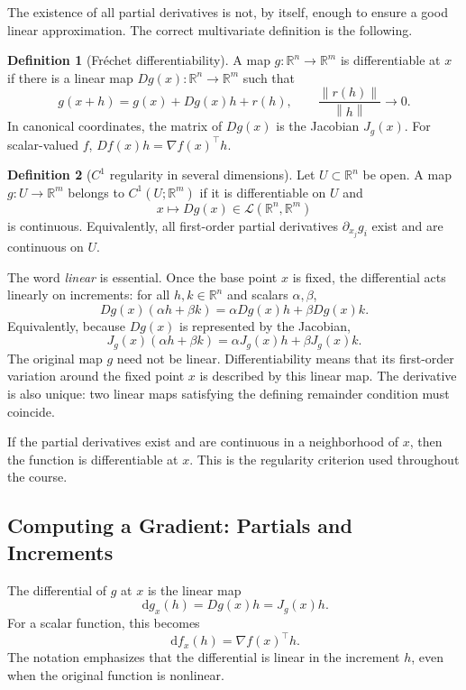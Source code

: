 \documentclass[11pt]{article}
\newcommand{\R}{\mathbb{R}}
\newcommand{\dd}{\,\mathrm{d}}
\newcommand{\norm}[1]{\left\lVert #1\right\rVert}
\theoremstyle{definition}
\newtheorem{definition}{Definition}[section]
\theoremstyle{plain}
\theoremstyle{remark}
\begin{document}
The existence of all partial derivatives is not, by itself, enough to ensure a
good linear approximation. The correct multivariate definition is the
following.

\begin{definition}[Fréchet differentiability]
A map $g:\R^n\to\R^m$ is differentiable at $x$ if there is a linear map
$Dg(x):\R^n\to\R^m$ such that
\[
g(x+h)=g(x)+Dg(x)h+r(h),
\qquad
\frac{\norm{r(h)}}{\norm{h}}\longrightarrow0.
\]
In canonical coordinates, the matrix of $Dg(x)$ is the Jacobian $J_g(x)$.
For scalar-valued $f$, $Df(x)h=\nabla f(x)^\top h$.
\end{definition}

\begin{definition}[$C^1$ regularity in several dimensions]
Let $U\subset\R^n$ be open. A map $g:U\to\R^m$ belongs to
$C^1(U;\R^m)$ if it is differentiable on $U$ and
\[
x\longmapsto Dg(x)\in\mathcal L(\R^n,\R^m)
\]
is continuous. Equivalently, all first-order partial derivatives
$\partial_{x_j}g_i$ exist and are continuous on $U$.
\end{definition}

The word \emph{linear} is essential. Once the base point $x$ is fixed, the
differential acts linearly on increments: for all $h,k\in\R^n$ and scalars
$\alpha,\beta$,
\[
\boxed{
Dg(x)(\alpha h+\beta k)
=\alpha Dg(x)h+\beta Dg(x)k.}
\]
Equivalently, because $Dg(x)$ is represented by the Jacobian,
\[
J_g(x)(\alpha h+\beta k)
=\alpha J_g(x)h+\beta J_g(x)k.
\]
The original map $g$ need not be linear. Differentiability means that its
first-order variation around the fixed point $x$ is described by this linear
map. The derivative is also unique: two linear maps satisfying the defining
remainder condition must coincide.

If the partial derivatives exist and are continuous in a neighborhood of $x$,
then the function is differentiable at $x$. This is the regularity criterion
used throughout the course.

\subsection{Computing a Gradient: Partials and Increments}

The differential of $g$ at $x$ is the linear map
\[
\dd g_x(h)=Dg(x)h=J_g(x)h.
\]
For a scalar function, this becomes
\[
\dd f_x(h)=\nabla f(x)^\top h.
\]
The notation emphasizes that the differential is linear in the increment
$h$, even when the original function is nonlinear.
\end{document}
